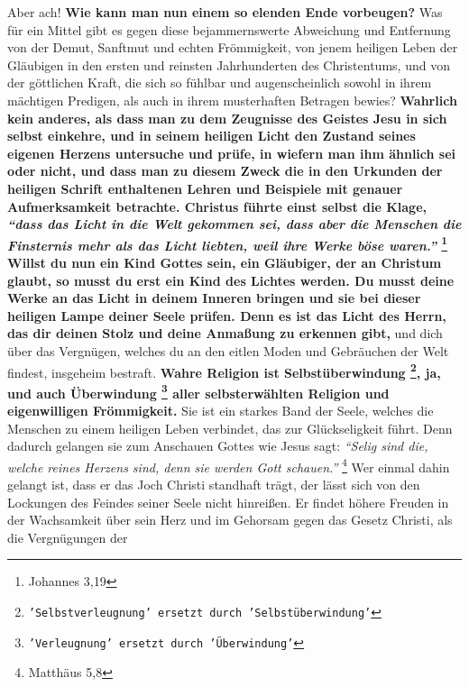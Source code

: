 Aber ach! \textbf{Wie kann man nun einem so elenden Ende vorbeugen?} Was für ein
Mittel
gibt es gegen diese bejammernswerte Abweichung und Entfernung von der Demut,
Sanftmut und echten Frömmigkeit, von jenem heiligen Leben der Gläubigen in den
ersten und reinsten Jahrhunderten des Christentums, und von der göttlichen
Kraft, die sich so fühlbar und augenscheinlich sowohl in ihrem mächtigen
Predigen, als auch in ihrem musterhaften Betragen bewies? \textbf{Wahrlich kein
anderes,
als dass man zu dem Zeugnisse des Geistes Jesu in sich
selbst einkehre, und in
seinem heiligen Licht den Zustand seines eigenen Herzens untersuche und prüfe,
in wiefern man ihm ähnlich sei oder nicht, und dass man zu diesem Zweck die in
den Urkunden der heiligen Schrift enthaltenen Lehren und
Beispiele mit genauer
Aufmerksamkeit betrachte. Christus führte einst selbst die Klage,
\textit{"`dass das
Licht in die Welt gekommen sei, dass aber die Menschen die Finsternis mehr als
das Licht liebten, weil ihre Werke böse waren."'}
\footnote{Johannes 3,19}
Willst du
nun ein Kind Gottes sein, ein Gläubiger, der an Christum
glaubt, so musst du erst
ein Kind des Lichtes werden. Du musst deine Werke an das
Licht in deinem Inneren
bringen und sie bei dieser heiligen Lampe deiner Seele prüfen. Denn es ist das
Licht des Herrn, das dir deinen Stolz und deine Anmaßung zu erkennen gibt,}
und
dich über das Vergnügen, welches du an den eitlen Moden und
Gebräuchen der Welt
findest, insgeheim bestraft.
\label{ref:12_11_eitle_menschen_erloesung}
\textbf{Wahre Religion ist Selbstüberwindung
\footnote{\texttt{'Selbstverleugnung' ersetzt durch 'Selbstüberwindung'}}, ja,
und auch Überwindung
\footnote{\texttt{'Verleugnung' ersetzt durch 'Überwindung'}}
aller selbsterwählten Religion und eigenwilligen Frömmigkeit.} Sie
ist ein starkes Band der Seele, welches die Menschen zu einem heiligen Leben
verbindet, das zur Glückseligkeit führt. Denn dadurch gelangen sie zum Anschauen
Gottes wie Jesus sagt:
\textit{"`Selig sind die, welche reines Herzens sind, denn sie
werden Gott schauen."'}
\footnote{Matthäus 5,8}
Wer einmal dahin gelangt ist, dass
er das Joch Christi standhaft trägt, der lässt sich von den Lockungen des Feindes
seiner Seele nicht hinreißen. Er findet höhere Freuden in der Wachsamkeit über
sein Herz und im Gehorsam gegen das Gesetz Christi, als die Vergnügungen der
